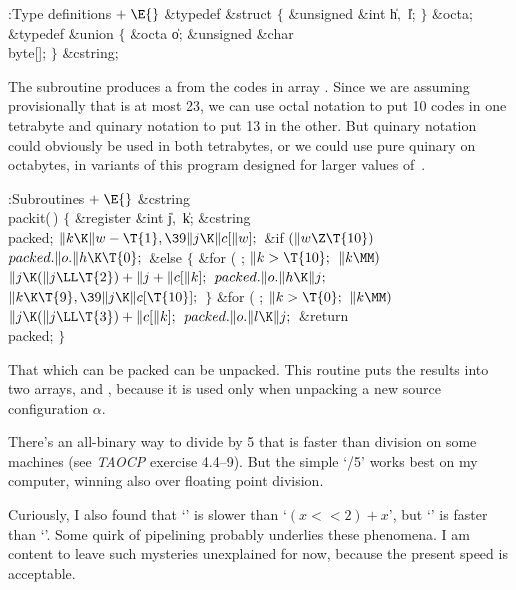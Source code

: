 \Y\B\4:Type definitions\X${}\mathrel+\E{}$\6
\&{typedef} \&{struct} ${}\{{}$\1\6
\&{unsigned} \&{int} \|h${},{}$ \|l;\2\6
${}\}{}$ \&{octa};\6
\&{typedef} \&{union} ${}\{{}$\1\6
\&{octa} \|o;\6
\&{unsigned} \&{char} \\{byte}[];\2\6
${}\}{}$ \&{cstring};\par
\fi

The  subroutine produces a  from the codes
in array .
Since we are assuming provisionally that  is at most 23, we can use
octal notation to put 10 codes in one tetrabyte and quinary notation
to put 13 in the other.
But quinary notation could obviously be used in both tetrabytes, or we
could use pure quinary on octabytes, in variants of
this program designed for larger values of~.

\Y\B\4:Subroutines\X${}\mathrel+\E{}$\6
\&{cstring} \\{packit}(\,)\1\1\2\2\6
${}\{{}$\1\6
\&{register} \&{int} \|j${},{}$ \|k;\6
\&{cstring} \\{packed};\7
${}\|k\K\|w-\T{1},\39\|j\K\|c[\|w];{}$\6
\&{if} ${}(\|w\Z\T{10}){}$\1\5
${}\\{packed}.\|o.\|h\K\T{0};{}$\2\6
\&{else}\5
${}\{{}$\1\6
\&{for} ( ; ${}\|k>\T{10};{}$ ${}\|k\MM){}$\1\5
${}\|j\K(\|j\LL\T{2})+\|j+\|c[\|k];{}$\2\6
${}\\{packed}.\|o.\|h\K\|j;{}$\6
${}\|k\K\T{9},\39\|j\K\|c[\T{10}];{}$\6
\4${}\}{}$\2\6
\&{for} ( ; ${}\|k>\T{0};{}$ ${}\|k\MM){}$\1\5
${}\|j\K(\|j\LL\T{3})+\|c[\|k];{}$\2\6
${}\\{packed}.\|o.\|l\K\|j;{}$\6
\&{return} \\{packed};\6
\4${}\}{}$\2\par
\fi

That which can be packed can be unpacked. This routine puts the
results into two arrays,  and , because it is used only when
unpacking a new source configuration $\alpha$.

There's an all-binary way to divide by 5 that is faster than division
on some machines (see {\sl TAOCP\/} exercise 4.4--9).
But the simple `/5' works best on my computer, winning also
over floating point division.

Curiously, I also found that `' is slower than `$(x<<2)+x$',
but
`' is faster than `'. Some
quirk of pipelining
probably underlies these phenomena. I am content to leave
such mysteries unexplained for now, because the present speed is acceptable.

